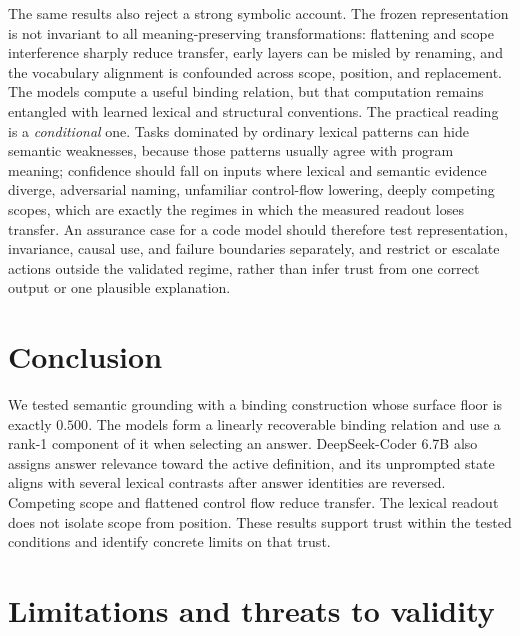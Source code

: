 \documentclass[10pt]{article}
\begin{document}
The same results also reject a strong symbolic account. The frozen representation
is not invariant to all meaning-preserving transformations: flattening and scope
interference sharply reduce transfer, early layers can be misled by renaming, and
the vocabulary alignment is confounded across scope, position, and replacement.
The models compute a useful binding relation, but that computation remains
entangled with learned lexical and structural conventions. The practical reading
is a \emph{conditional} one. Tasks dominated by ordinary lexical patterns can hide
semantic weaknesses, because those patterns usually agree with program meaning;
confidence should fall on inputs where lexical and semantic evidence diverge, 
adversarial naming, unfamiliar control-flow lowering, deeply competing scopes, 
which are exactly the regimes in which the measured readout loses transfer. An
assurance case for a code model should therefore test representation, invariance,
causal use, and failure boundaries separately, and restrict or escalate actions
outside the validated regime, rather than infer trust from one correct output or
one plausible explanation.

\section{Conclusion}
We tested semantic grounding with a binding construction whose surface floor is
exactly $0.500$. The models form a linearly recoverable binding relation and use
a rank-1 component of it when selecting an answer. DeepSeek-Coder 6.7B also
assigns answer relevance toward the active definition, and its unprompted state
aligns with several lexical contrasts after answer identities are reversed.
Competing scope and flattened control flow reduce transfer. The lexical readout
does not isolate scope from position. These results support trust within the
tested conditions and identify concrete limits on that trust.

\section*{Limitations and threats to validity}
\end{document}
